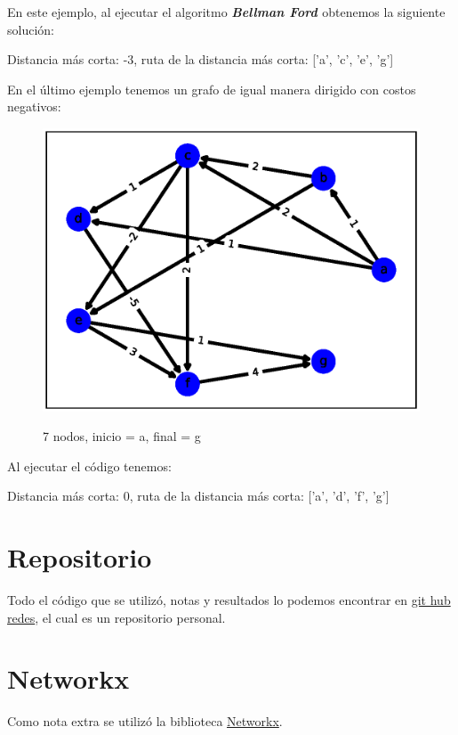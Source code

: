 \documentclass{report}
\newcommand{\bell}{{\bfseries {\textit{Bellman Ford }}}}
\begin{document}
En este ejemplo, al ejecutar el algoritmo \bell obtenemos la siguiente solución:
\begin{center}
    Distancia más corta:
    -3, ruta de la distancia más corta:
    ['a', 'c', 'e', 'g']
\end{center}

En el último ejemplo tenemos un grafo de igual manera dirigido con costos negativos:

\begin{figure}[h!t]
    \centering
    \includegraphics[scale = 0.5]{ejemplo7.eps}
    \label{figura7}
    \caption{7 nodos, inicio = a, final = g}
\end{figure}

Al ejecutar el código tenemos:
\begin{center}
    Distancia más corta:
    0, ruta de la distancia más corta:
    ['a', 'd', 'f', 'g']
\end{center}

\section{Repositorio}
Todo el código que se utilizó, notas y resultados lo podemos encontrar en \href{https://github.com/arnoldae9/redes.git}{git hub redes}, el cual es un repositorio personal.

\section{Networkx}
Como nota extra se utilizó la biblioteca \href{https://networkx.org/}{Networkx}.
\end{document}
